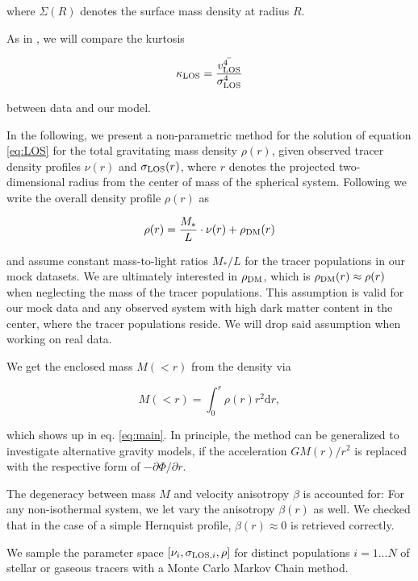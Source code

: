 where $\Sigma(R)$ denotes the surface mass density at radius $R$. 

As in \cite{Lokas+2005}, we will compare the kurtosis

\begin{equation*}
\kappa_{\rm LOS}=\frac{\bar{v_{\rm LOS}^4}}{\sigma_{\rm LOS}^4}
\end{equation*}

between data and our model.

In the following, we present a non-parametric method for the solution
of equation \ref{eq:LOS} for the total gravitating mass density
$\rho(r)$, given observed tracer density profiles $\nu(r)$ and
$\sigma_{\text{LOS}}(r)$, where $r$ denotes the projected two-dimensional radius
from the center of mass of the spherical system. Following
\cite{Jardel+2012} we write the overall density profile $\rho(r)$ as

\begin{equation}
    \rho(r) = \frac{M_*}{L}\cdot \nu(r)+\rho_{\rm{DM}}(r)
\end{equation}

and assume constant mass-to-light ratios $M_*/L$ for the tracer
populations in our mock datasets. We are ultimately interested in
$\rho_{\rm{DM}}$, which is $\rho_{\rm{DM}}(r)\approx\rho(r)$ when
neglecting the mass of the tracer populations. This assumption is
valid for our mock data and any observed system with high dark matter
content in the center, where the tracer populations reside. We will
drop said assumption when working on real data.

We get the enclosed mass $M(<r)$ from the density via

\begin{equation}
M(<r) = \int_0^r \rho(r) r^2 \text{d}r,
\end{equation}

which shows up in eq. \ref{eq:main}. In principle, the method can be
generalized to investigate alternative gravity models, if the
acceleration $GM(r)/r^2$ is replaced with the respective form of
$-\partial\Phi/\partial r$.

The degeneracy between mass $M$ and velocity anisotropy $\beta$ is
accounted for: For any non-isothermal system, we let vary the
anisotropy $\beta(r)$ as well. We checked that in the case of a simple
Hernquist profile, $\beta(r)\approx0$ is retrieved correctly.

We sample the parameter space $[\nu_i, \sigma_{\text{LOS},i}, \rho]$ for distinct
populations $i=1...N$ of stellar or gaseous tracers with a Monte Carlo Markov Chain method.

